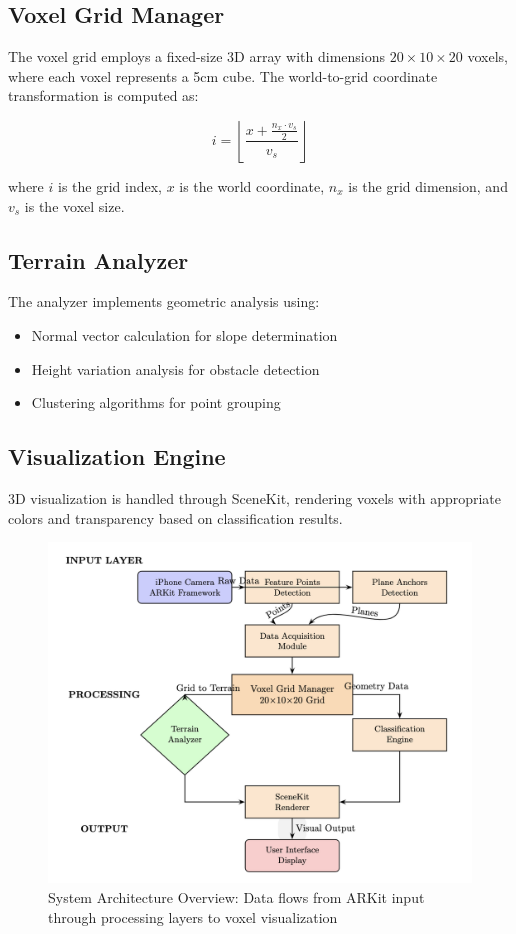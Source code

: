 \documentclass[conference]{IEEEtran}
\begin{document}
\subsection{Voxel Grid Manager}
The voxel grid employs a fixed-size 3D array with dimensions $20 \times 10 \times 20$ voxels, where each voxel represents a 5cm cube. The world-to-grid coordinate transformation is computed as:

\begin{equation}
    i = \left\lfloor \frac{x + \frac{n_x \cdot v_s}{2}}{v_s} \right\rfloor
\end{equation}

where $i$ is the grid index, $x$ is the world coordinate, $n_x$ is the grid dimension, and $v_s$ is the voxel size.

\subsection{Terrain Analyzer}
The analyzer implements geometric analysis using:
\begin{itemize}
    \item Normal vector calculation for slope determination
    \item Height variation analysis for obstacle detection
    \item Clustering algorithms for point grouping
\end{itemize}

\subsection{Visualization Engine}
3D visualization is handled through SceneKit, rendering voxels with appropriate colors and transparency based on classification results.

\begin{figure}[H]
    \centering
    \includegraphics[width=\columnwidth]{System.png}
    \caption{System Architecture Overview: Data flows from ARKit input through processing layers to voxel visualization}
    \label{fig:architecture}
    \end{figure}
\end{document}
